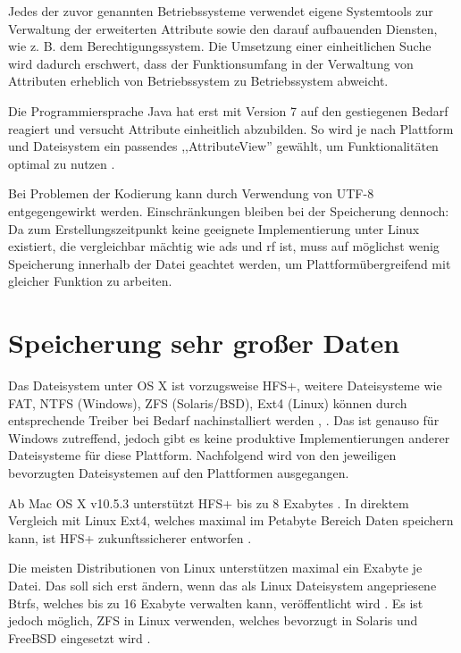 \documentclass[oneside, ngerman, toc=bibliography,bibliography=totoc,listof=entryprefix, open=right,numbers=noenddot,fontsize=12pt]{scrbook}
\begin{document}
Jedes der zuvor genannten Betriebssysteme verwendet eigene Systemtools zur Verwaltung der erweiterten Attribute sowie den darauf aufbauenden Diensten, wie z. B. dem Berechtigungssystem. Die Umsetzung einer einheitlichen Suche wird dadurch erschwert, dass der Funktionsumfang in der Verwaltung von Attributen erheblich von Betriebssystem zu Betriebssystem abweicht.

Die Programmiersprache Java hat erst mit Version 7 auf den gestiegenen Bedarf reagiert und versucht Attribute einheitlich abzubilden. So wird je nach Plattform und Dateisystem ein passendes ,,AttributeView'' gewählt, um Funktionalitäten optimal zu nutzen \cite{javanio}.

Bei Problemen der Kodierung kann durch Verwendung von UTF-8 entgegengewirkt werden.
Einschränkungen bleiben bei der Speicherung dennoch: Da zum Erstellungszeitpunkt keine geeignete Implementierung unter Linux existiert, die vergleichbar mächtig  wie \acrshort{ads} und \acrshort{rf} ist, muss auf möglichst wenig Speicherung innerhalb der Datei geachtet werden, um Plattformübergreifend mit gleicher Funktion zu arbeiten.

  

\section{Speicherung sehr großer Daten}

Das Dateisystem unter OS X ist vorzugsweise {HFS+}, weitere Dateisysteme wie {FAT}, { NTFS} (Windows), {ZFS} (Solaris/BSD), {Ext4} (Linux) können durch entsprechende Treiber bei Bedarf nachinstalliert werden \cite{winext}, \cite{macntfs}. Das ist genauso für Windows zutreffend, jedoch gibt es keine produktive Implementierungen anderer Dateisysteme für diese Plattform.
Nachfolgend wird von den jeweiligen bevorzugten Dateisystemen auf den Plattformen ausgegangen.

Ab Mac OS X v10.5.3 unterstützt  {HFS+} bis zu 8 Exabytes \cite{maclimit}. In direktem Vergleich mit Linux Ext4, welches maximal im Petabyte Bereich Daten speichern kann, ist HFS+ zukunftssicherer entworfen \cite{kernelwiki}.

Die meisten Distributionen von Linux unterstützen maximal ein Exabyte je Datei. Das soll sich erst ändern, wenn das als Linux Dateisystem angepriesene {Btrfs}, welches bis zu 16 Exabyte verwalten kann, veröffentlicht wird \cite{btrfs}. Es ist jedoch möglich, ZFS in Linux verwenden, welches bevorzugt in Solaris und FreeBSD eingesetzt wird \cite{zfslinux}.
\end{document}
